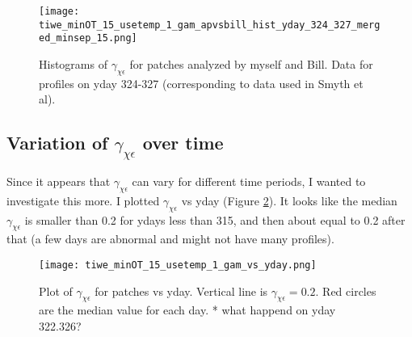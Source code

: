 \documentclass[11pt]{article}
\begin{document}
\begin{figure}[htbp]
\texttt{[image: tiwe\_minOT\_15\_usetemp\_1\_gam\_apvsbill\_hist\_yday\_324\_327\_merged\_minsep\_15.png]}
\caption{Histograms of $\gamma_{\chi\epsilon}$ for patches analyzed by myself and Bill. Data for profiles on yday 324-327 (corresponding to data used in Smyth et al).}
\label{comp_bill_ap_gam_324_327}
\end{figure}





%
%









\clearpage
\subsection{Variation of $\gamma_{\chi\epsilon}$ over time}

Since it appears that $\gamma_{\chi\epsilon}$ can vary for different time periods, I wanted to investigate this more. I plotted $\gamma_{\chi\epsilon}$ vs yday (Figure \ref{gamvsyday}). It looks like the median $\gamma_{\chi\epsilon}$ is smaller than 0.2 for ydays less than 315, and then about equal to 0.2 after that (a few days are abnormal and might not have many profiles).

\begin{figure}[htbp]
\texttt{[image: tiwe\_minOT\_15\_usetemp\_1\_gam\_vs\_yday.png]}
\caption{Plot of $\gamma_{\chi\epsilon}$ for patches vs yday. Vertical line is $\gamma_{\chi\epsilon}=0.2$. Red circles are the median value for each day. * what happend on yday 322.326?}
\label{gamvsyday}
\end{figure}





\end{document}
